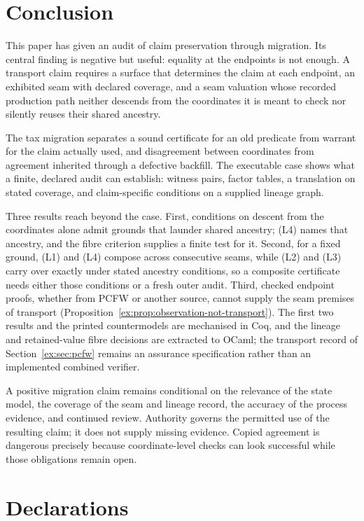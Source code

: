 \documentclass[smallextended,envcountsect,envcountsame,natbib]{svjour3}
\begin{document}
\section{Conclusion}\label{ex:sec:conclusion}
This paper has given an audit of claim preservation through migration. Its central finding is negative but useful: equality at the endpoints is not enough. A transport claim requires a surface that determines the claim at each endpoint, an exhibited seam with declared coverage, and a seam valuation whose recorded production path neither descends from the coordinates it is meant to check nor silently reuses their shared ancestry.

The tax migration separates a sound certificate for an old predicate from warrant for the claim actually used, and disagreement between coordinates from agreement inherited through a defective backfill. The executable case shows what a finite, declared audit can establish: witness pairs, factor tables, a translation on stated coverage, and claim-specific conditions on a supplied lineage graph.

Three results reach beyond the case. First, conditions on descent from the coordinates alone admit grounds that launder shared ancestry; (L4) names that ancestry, and the fibre criterion supplies a finite test for it. Second, for a fixed ground, (L1) and (L4) compose across consecutive seams, while (L2) and (L3) carry over exactly under stated ancestry conditions, so a composite certificate needs either those conditions or a fresh outer audit. Third, checked endpoint proofs, whether from PCFW or another source, cannot supply the seam premises of transport (Proposition~\ref{ex:prop:observation-not-transport}). The first two results and the printed countermodels are mechanised in Coq, and the lineage and retained-value fibre decisions are extracted to OCaml; the transport record of Section~\ref{ex:sec:pcfw} remains an assurance specification rather than an implemented combined verifier.

A positive migration claim remains conditional on the relevance of the state model, the coverage of the seam and lineage record, the accuracy of the process evidence, and continued review. Authority governs the permitted use of the resulting claim; it does not supply missing evidence. Copied agreement is dangerous precisely because coordinate-level checks can look successful while those obligations remain open.


\section*{Declarations}
\end{document}
